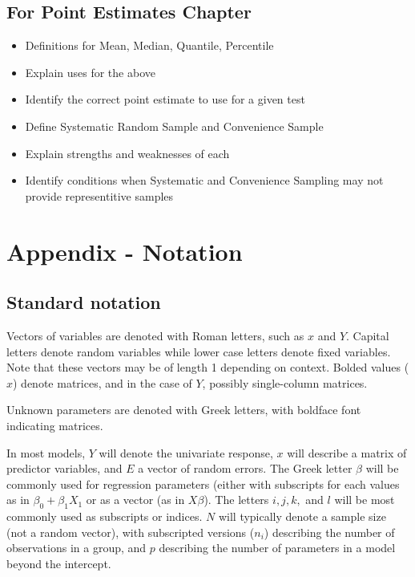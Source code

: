 \documentclass[]{book}
\theoremstyle{definition}
\theoremstyle{definition}
\theoremstyle{definition}
\theoremstyle{remark}
\begin{document}
\section{For Point Estimates Chapter}\label{for-point-estimates-chapter}

\begin{itemize}
\item
  Definitions for Mean, Median, Quantile, Percentile
\item
  Explain uses for the above
\item
  Identify the correct point estimate to use for a given test
\item
  Define Systematic Random Sample and Convenience Sample
\item
  Explain strengths and weaknesses of each
\item
  Identify conditions when Systematic and Convenience Sampling may not
  provide representitive samples
\end{itemize}

\chapter{Appendix - Notation}\label{notation}

\section{Standard notation}\label{standard-notation}

Vectors of variables are denoted with Roman letters, such as \(x\) and
\(Y\). Capital letters denote random variables while lower case letters
denote fixed variables. Note that these vectors may be of length 1
depending on context. Bolded values (\textbf{\(x\)}) denote matrices,
and in the case of \textbf{\(Y\)}, possibly single-column matrices.

Unknown parameters are denoted with Greek letters, with boldface font
indicating matrices.

In most models, \(Y\) will denote the univariate response,
\textbf{\(x\)} will describe a matrix of predictor variables, and \(E\)
a vector of random errors. The Greek letter \(\beta\) will be commonly
used for regression parameters (either with subscripts for each values
as in \(\beta_0 + \beta_1 X_1\) or as a vector (as in \(X\beta\)). The
letters \(i, j, k,\) and \(l\) will be most commonly used as subscripts
or indices. \(N\) will typically denote a sample size (not a random
vector), with subscripted versions (\(n_i\)) describing the number of
observations in a group, and \(p\) describing the number of parameters
in a model beyond the intercept.
\end{document}
